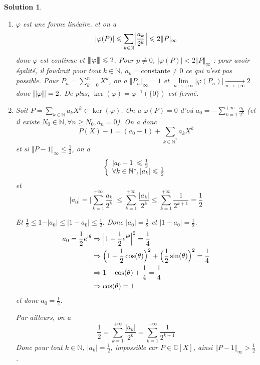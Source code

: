 \documentclass[12pt]{article}
\newtheorem{solution}{Solution}[section]
\theoremstyle{remark}
\newcommand{\C}{\mathbb{C}} \newcommand{\Q}{\mathbb{Q}}
\newcommand{\N}{\mathbb{N}} \newcommand{\Z}{\mathbb{Z}}
\newcommand{\vertiii}[1]{{\left\vert\kern-0.25ex\left\vert\kern-0.25ex\left\vert{}#1
\right\vert\kern-0.25ex\right\vert\kern-0.25ex\right\vert}}
\numberwithin{equation}{section}
\begin{document}
\begin{solution}
	\phantom{}
	\begin{enumerate}
		\item $\varphi$ est une forme linéaire. et on a 
		$$\vert\varphi(P)\vert\leqslant\sum_{k\in\N}\Bigl\vert\frac{a_k}{2^{k}}\Bigr\vert\leqslant2\Vert P\vert_{\infty}$$
		donc $\varphi$ est continue et $\vertiii{\varphi}\leqslant2$. Pour $p\neq0$, $\vert\varphi(P)\vert<2\Vert P\Vert_{\infty}$ : pour avoir égalité, il faudrait pour tout $k\in\N$, $a_{k}=\text{constante}\neq0$ ce qui n'est pas possible. Pour $P_{n}=\sum_{k=0}^{n}X^{k}$, on a $\Vert P_{n}\Vert_{\infty}=1$ et $\lim\limits_{n\to+\infty}\vert\varphi(P_{n})\vert\xrightarrow[n\to+\infty]{}2$ donc $\vertiii{\varphi}=2$. De plus, $\ker(\varphi)=\varphi^{-1}(\{0\})$ est fermé.

		\item Soit $P=\sum_{k\in\N}a_{k}X^{k}\in\ker(\varphi)$. On a $\varphi(P)=0$ d'où $a_{0}=-\sum_{k=1}^{+\infty}\frac{a_{k}}{2^{k}}$ (et il existe $N_{0}\in\N,\forall n\geqslant N_{0},a_{n}=0$). On a donc 
		$$P(X)-1=(a_{0}-1)+\sum_{k\in\N^{*}}a_{k}X^{k}$$
		et si $\Vert P-1\Vert_{\infty}\leqslant\frac{1}{2}$, on a 
		$$
		\left\{
			\begin{array}[]{l}
				\vert a_{0}-1\vert\leqslant\frac{1}{2}\\
				\forall k\in\N^{*},\vert a_{k}\vert\leqslant\frac{1}{2}
			\end{array}
		\right.
		$$
		et 
		$$\vert a_{0}\vert=\Biggl\vert\sum_{k=1}^{+\infty}\frac{a_{k}}{2^{k}}\Biggr\vert\leqslant\sum_{k=1}^{+\infty}\frac{\vert a_{k}\vert}{2^{k}}\leqslant\sum_{k=1}^{+\infty}\frac{1}{2^{k+1}}=\frac{1}{2}$$

		Et $\frac{1}{2}\leqslant 1-\vert a_{0}\vert\leqslant\vert 1-a_{0}\vert\leqslant\frac{1}{2}$. Donc $\vert a_{0}\vert=\frac{1}{2}$ et $\vert 1-a_{0}\vert=\frac{1}{2}$.
		\begin{align*}
			a_{0}=\frac{1}{2}e^{\mathrm{i}\theta}
			&\Rightarrow \Bigl\vert 1-\frac{1}{2}e^{\mathrm{i}\theta}\Bigr\vert^{2}=\frac{1}{4}\\
			&\Rightarrow \Bigl(1-\frac{1}{2}\cos(\theta)\Bigr)^{2}+\Bigl(\frac{1}{2}\sin(\theta)\Bigr)^{2}=\frac{1}{4}\\
			&\Rightarrow 1-\cos(\theta)+\frac{1}{4}=\frac{1}{4}\\
			&\Rightarrow \cos(\theta)=1
		\end{align*}
		et donc $a_{0}=\frac{1}{2}$.

		Par ailleurs, on a 
		$$\frac{1}{2}=\sum_{k=1}^{+\infty}\frac{\vert a_{k}\vert}{2^{k}}=\sum_{k=1}^{+\infty}\frac{1}{2^{k+1}}$$
		Donc pour tout $k\in\N$, $\vert a_{k}\vert=\frac{1}{2}$, impossible car $P\in\C[X]$, ainsi $\Vert P-1\Vert_{\infty}>\frac{1}{2}$.


\end{enumerate}
\end{solution}
\end{document}
